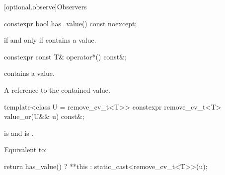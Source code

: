 [optional.observe]{Observers}

%
\begin{itemdecl}
constexpr bool has_value() const noexcept;
\end{itemdecl}

\begin{itemdescr}
\pnum
\returns
{} if and only if  contains a value.
\end{itemdescr}

%
\begin{itemdecl}
constexpr const T& operator*() const&;
\end{itemdecl}

\begin{itemdescr}
\pnum
\hardexpects
{} contains a value.

\pnum
\returns
A reference to the contained value.
\end{itemdescr}

%
\begin{itemdecl}
template<class U = remove_cv_t<T>>
  constexpr remove_cv_t<T> value_or(U&& u) const&;
\end{itemdecl}

\begin{itemdescr}
\pnum
\mandates
{} is  and  is .

\pnum
\effects
Equivalent to:
\begin{codeblock}
return has_value() ? **this : static_cast<remove_cv_t<T>>(u);
\end{codeblock}
\end{itemdescr}
